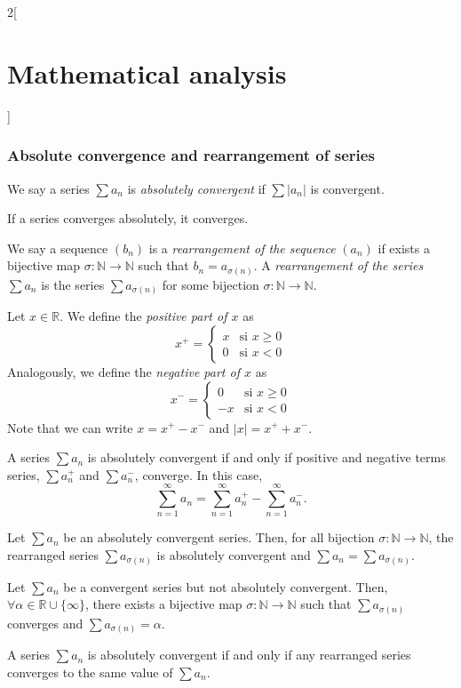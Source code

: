 \documentclass[../../../main.tex]{subfiles}
\begin{document}
\begin{multicols}{2}[\section{Mathematical analysis}]
\subsubsection*{Absolute convergence and rearrangement of series}
\begin{definition}
We say a series $\sum a_n$ is \textit{absolutely convergent} if $\sum |a_n|$ is convergent.
\end{definition}
\begin{theorem}
If a series converges absolutely, it converges.
\end{theorem}
\begin{definition}
We say a sequence $(b_n)$ is a \textit{rearrangement of the sequence} $(a_n)$ if exists a bijective map $\sigma:\mathbb{N}\rightarrow\mathbb{N}$ such that $b_n=a_{\sigma(n)}$. A \textit{rearrangement of the series} $\sum a_n$ is the series $\sum a_{\sigma(n)}$ for some bijection $\sigma:\mathbb{N}\rightarrow\mathbb{N}$.
\end{definition}
\begin{definition}
Let $x\in\mathbb{R}$. We define the \textit{positive part of $x$} as $$x^+=
\begin{cases} 
  x & \text{si }x\geq 0 \\
  0 & \text{si }x<0 
\end{cases}$$ Analogously, we define the \textit{negative part of $x$} as $$x^-=
\begin{cases} 
  0 & \text{si }x\geq 0 \\
  -x & \text{si }x<0 
\end{cases}$$ Note that we can write $x=x^+-x^-$ and $|x|=x^++x^-$.
\end{definition}
\begin{theorem}
A series $\sum a_n$ is absolutely convergent if and only if positive and negative terms series, $\sum a_n^+$ and $\sum a_n^-$, converge. In this case, $$\sum_{n=1}^\infty a_n=\sum_{n=1}^\infty a_n^+-\sum_{n=1}^\infty a_n^-.$$
\end{theorem}
\begin{theorem}
Let $\sum a_n$ be an absolutely convergent series. Then, for all bijection $\sigma:\mathbb{N}\rightarrow\mathbb{N}$, the rearranged series $\sum a_{\sigma(n)}$ is absolutely convergent and $\sum a_n=\sum a_{\sigma(n)}$.
\end{theorem}
\begin{theorem}
Let $\sum a_n$ be a convergent series but not absolutely convergent. Then, $\forall\alpha\in\mathbb{R}\cup\{\infty\}$, there exists a bijective map $\sigma:\mathbb{N}\rightarrow\mathbb{N}$ such that $\sum a_{\sigma(n)}$ converges and $\sum a_{\sigma(n)}=\alpha$.
\end{theorem}
\begin{theorem}
A series $\sum a_n$ is absolutely convergent if and only if any rearranged series converges to the same value of $\sum a_n$.
\end{theorem}

\end{multicols}
\end{document}
